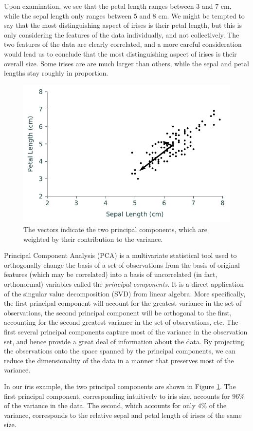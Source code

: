 Upon examination, we see that the petal length ranges between $3$ and $7$ cm, while the sepal length only ranges between $5$ and $8$ cm. We might be tempted to say that the most distinguishing aspect of irises is their petal length, but this is only considering the features of the data individually, and not collectively. The two features of the data are clearly correlated, and a more careful consideration would lead us to conclude that the most distinguishing aspect of irises is their overall size. Some irises are are much larger than others, while the sepal and petal lengths stay roughly in proportion.
\begin{figure}[H]
\includegraphics[width=.7\textwidth]{figures/iris2.pdf}
\caption{The vectors indicate the two principal components, which are weighted by their contribution to the variance.}
\label{fig:iris_2}
\end{figure}

Principal Component Analysis (PCA) is a multivariate statistical tool used to orthogonally change the basis of a set of observations from the basis of original features (which may be correlated) into a basis of uncorrelated (in fact, orthonormal) variables called the \emph{principal components}. It is a direct application of the singular value decomposition (SVD) from linear algebra. More specifically, the first principal component will account for the greatest variance in the set of observations, the second principal component will be orthogonal to the first, accounting for the second greatest variance in the set of observations, etc. The first several principal components capture most of the variance in the observation set, and hence provide a great deal of information about the data. By projecting the observations onto the space spanned by the principal components, we can reduce the dimensionality of the data in a manner that preserves most of the variance.

In our iris example, the two principal components are shown in Figure \ref{fig:iris_2}. The first principal component, corresponding intuitively to iris size, accounts for $96\%$ of the variance in the data. The second, which accounts for only $4\%$ of the variance, corresponds to the relative sepal and petal length of irises of the same size.

